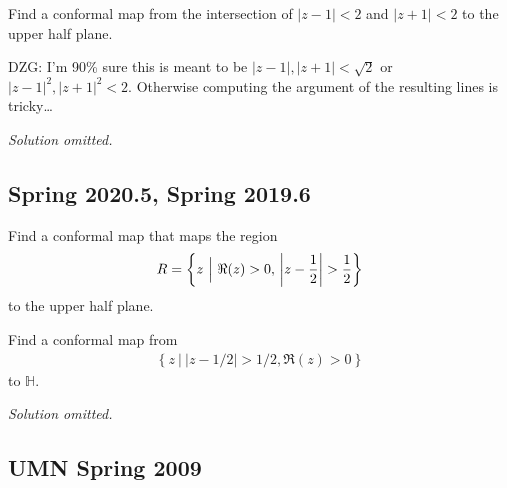 \begin{problem}[?]

Find a conformal map from the intersection of \(|z-1|<2\) and
\(|z+1|<2\) to the upper half plane.

\end{problem}

\begin{warnings}

DZG: I'm 90\% sure this is meant to be
\({\left\lvert {z-1} \right\rvert}, {\left\lvert {z+1} \right\rvert} < \sqrt{2}\)
or
\({\left\lvert {z-1} \right\rvert}^2,{\left\lvert {z+1} \right\rvert}^2 < 2\).
Otherwise computing the argument of the resulting lines is
tricky\ldots{}

\end{warnings}

\emph{Solution omitted.}

\hypertarget{spring-2020.5-spring-2019.6}{%
\subsection{Spring 2020.5, Spring
2019.6}\label{spring-2020.5-spring-2019.6}}

\begin{problem}[Spring 2020.5]

Find a conformal map that maps the region
\begin{align*}
R = \left\{{z {~\mathrel{\Big\vert}~}\Re(z) > 0,\, {\left\lvert {z - {1\over 2} } \right\rvert}> {1\over 2} }\right\}
\end{align*}
to the upper half plane.

\end{problem}

\begin{problem}[Spring 2019.6]

Find a conformal map from
\begin{align*}
\left\{{ z{~\mathrel{\Big\vert}~}{\left\lvert {z -1 / 2} \right\rvert} >1 / 2, \Re(z)>0 }\right\}
\end{align*}
to \(\mathbb{H}\).

\end{problem}

\emph{Solution omitted.}

\hypertarget{umn-spring-2009}{%
\subsection{UMN Spring 2009}\label{umn-spring-2009}}

